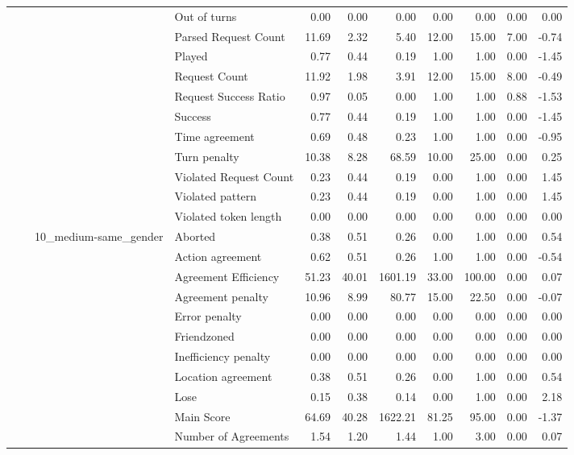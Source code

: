 \begin{tabular}{llllrrrrrrr}
 &  &  & Out of turns & 0.00 & 0.00 & 0.00 & 0.00 & 0.00 & 0.00 & 0.00 \\
 &  &  & Parsed Request Count & 11.69 & 2.32 & 5.40 & 12.00 & 15.00 & 7.00 & -0.74 \\
 &  &  & Played & 0.77 & 0.44 & 0.19 & 1.00 & 1.00 & 0.00 & -1.45 \\
 &  &  & Request Count & 11.92 & 1.98 & 3.91 & 12.00 & 15.00 & 8.00 & -0.49 \\
 &  &  & Request Success Ratio & 0.97 & 0.05 & 0.00 & 1.00 & 1.00 & 0.88 & -1.53 \\
 &  &  & Success & 0.77 & 0.44 & 0.19 & 1.00 & 1.00 & 0.00 & -1.45 \\
 &  &  & Time agreement & 0.69 & 0.48 & 0.23 & 1.00 & 1.00 & 0.00 & -0.95 \\
 &  &  & Turn penalty & 10.38 & 8.28 & 68.59 & 10.00 & 25.00 & 0.00 & 0.25 \\
 &  &  & Violated Request Count & 0.23 & 0.44 & 0.19 & 0.00 & 1.00 & 0.00 & 1.45 \\
 &  &  & Violated pattern & 0.23 & 0.44 & 0.19 & 0.00 & 1.00 & 0.00 & 1.45 \\
 &  &  & Violated token length & 0.00 & 0.00 & 0.00 & 0.00 & 0.00 & 0.00 & 0.00 \\
\cline{3-11}
 &  & \multirow[t]{27}{*}{10_medium-same_gender} & Aborted & 0.38 & 0.51 & 0.26 & 0.00 & 1.00 & 0.00 & 0.54 \\
 &  &  & Action agreement & 0.62 & 0.51 & 0.26 & 1.00 & 1.00 & 0.00 & -0.54 \\
 &  &  & Agreement Efficiency & 51.23 & 40.01 & 1601.19 & 33.00 & 100.00 & 0.00 & 0.07 \\
 &  &  & Agreement penalty & 10.96 & 8.99 & 80.77 & 15.00 & 22.50 & 0.00 & -0.07 \\
 &  &  & Error penalty & 0.00 & 0.00 & 0.00 & 0.00 & 0.00 & 0.00 & 0.00 \\
 &  &  & Friendzoned & 0.00 & 0.00 & 0.00 & 0.00 & 0.00 & 0.00 & 0.00 \\
 &  &  & Inefficiency penalty & 0.00 & 0.00 & 0.00 & 0.00 & 0.00 & 0.00 & 0.00 \\
 &  &  & Location agreement & 0.38 & 0.51 & 0.26 & 0.00 & 1.00 & 0.00 & 0.54 \\
 &  &  & Lose & 0.15 & 0.38 & 0.14 & 0.00 & 1.00 & 0.00 & 2.18 \\
 &  &  & Main Score & 64.69 & 40.28 & 1622.21 & 81.25 & 95.00 & 0.00 & -1.37 \\
 &  &  & Number of Agreements & 1.54 & 1.20 & 1.44 & 1.00 & 3.00 & 0.00 & 0.07 \\

\end{tabular}
